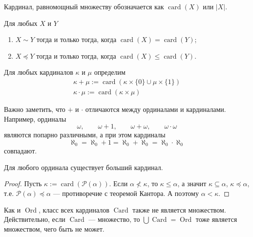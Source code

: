 \documentclass[12pt,a4paper]{article}
\newcommand{\subsets}{\ensuremath{\mathcal{P}}\xspace}
\DeclareMathOperator{\Ord}{Ord}
\DeclareMathOperator{\card}{card}
\DeclareMathOperator{\Card}{Card}
\begin{document}
    \begin{definition}
        Кардинал, равномощный множеству обозначается как $\card(X)$ или $|X|$.
    \end{definition}

    \begin{statement}
        Для любых $X$ и $Y$
        \begin{enumerate}
            \item $X \sim Y$ тогда и только тогда, когда $\card(X) = \card(Y)$;
            \item $X \preccurlyeq Y$ тогда и только тогда, когда $\card(X) \leqslant \card(Y)$.
        \end{enumerate}
    \end{statement}

    \begin{definition}
        Для любых кардиналов $\kappa$ и $\mu$ определим
        \begin{gather}
            \kappa + \mu := \card(\kappa \times \{0\} \cup \mu \times \{1\})\\
            \kappa \cdot \mu := \card(\kappa \times \mu)
        \end{gather}
    \end{definition}

    \begin{remark*}
        Важно заметить, что $+$ и $\cdot$ отличаются между ординалами и кардиналами. Например, ординалы
        \[\omega, \qquad \omega + 1, \qquad \omega + \omega, \qquad \omega \cdot \omega\]
        являются попарно различными, а при этом кардиналы
        \[\aleph_0 = \aleph_0 + 1 = \aleph_0 + \aleph_0 = \aleph_0 \cdot \aleph_0\]
        совпадают.
    \end{remark*}

    \begin{statement}
        Для любого ординала существует больший кардинал.
    \end{statement}

    \begin{proof}
        Пусть $\kappa := \card(\subsets(\alpha))$. Если $\alpha \nless \kappa$, то $\kappa \leqslant \alpha$, а значит $\kappa \subseteq \alpha$, $\kappa \preccurlyeq \alpha$, т.е. $\subsets(\alpha) \preccurlyeq \alpha$ --- противоречие с теоремой Кантора. А поэтому $\alpha < \kappa$.
    \end{proof}

    \begin{remark}
        Как и $\Ord$, класс всех кардиналов $\Card$ также не является множеством. Действительно, если $\Card$ --- множество, то $\bigcup \Card = \Ord$ тоже является множеством, чего быть не может.
    \end{remark}
    
\end{document}
